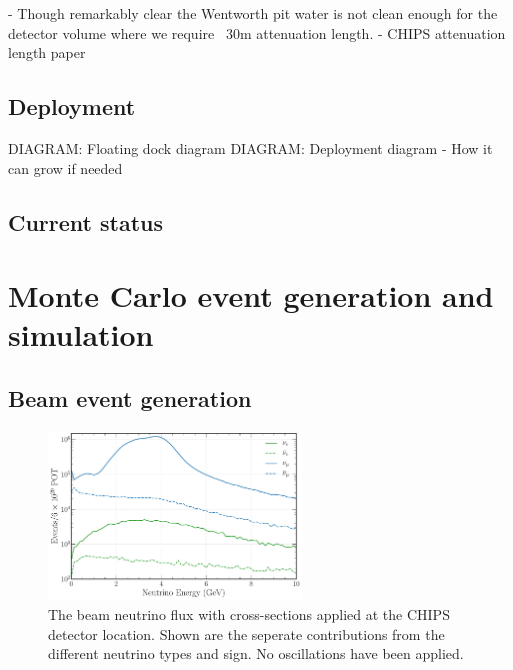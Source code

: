 - Though remarkably clear the Wentworth pit water is not clean enough for the detector volume
where we require ~30m attenuation length.
- CHIPS attenuation length paper~\cite{amat2017}

\subsection{Deployment} %
\label{sec:chips_detector_deployment} %

DIAGRAM: Floating dock diagram
DIAGRAM: Deployment diagram
- How it can grow if needed

\subsection{Current status} %
\label{sec:chips_detector_status} %

\section{Monte Carlo event generation and simulation} %
\label{sec:chips_monte_carlo} %

\subsection{Beam event generation} %
\label{sec:chips_monte_carlo_beam} %

\begin{figure} %
    \includegraphics[width=0.6\textwidth]{diagrams/4-chips/flux.pdf}
    \caption[\numi neutrino flux at CHIPS.]
    {The \numi beam neutrino flux with cross-sections applied at the CHIPS detector location. Shown
        are the seperate contributions from the different neutrino types and sign. No oscillations
        have been applied.}
    \label{fig:flux}
\end{figure}



